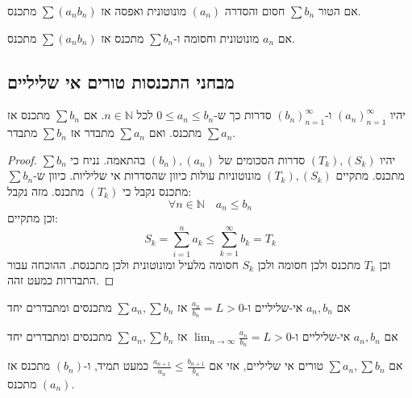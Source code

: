 \documentclass{tstextbook}
\begin{document}
\begin{proposition}
אם הטור \(\sum b_n\) חסום והסדרה \((a_n)\) מונוטונית ואפסה אז \(\sum (a_n b_n)\) מתכנס.

\end{proposition}
\begin{proposition}
אם \(a_n\) מונוטונית וחסומה ו-\(\sum b_n\) מתכנס אז \(\sum (a_n b_n)\) מתכנס.

\end{proposition}
\subsection{מבחני התכנסות טורים אי שליליים}

\begin{theorem}
יהיו \((a_n)_{n=1}^\infty\) ו-\((b_n)_{n=1}^\infty\) סדרות כך ש-\(0\leq a_{n}\leq b_{n}\) לכל \(n \in \mathbb{N}\). אם \(\sum b_{n}\) מתכנס אז \(\sum a_{n}\) מתכנס. ואם \(\sum a_{n}\) מתבדר אז \(\sum b_{n}\) מתבדר.

\end{theorem}
\begin{proof}
יהיו \((T_{k}),(S_{k})\) סדרות הסכומים של \((b_{n}),(a_{n})\) בהתאמה. נניח כי \(\sum b_{n}\) מתכנס. מתקיים \((T_{k}),(S_{k})\) מונוטוניות עולות כיוון שהסדרות אי שליליות. כיוון ש-\(\sum b_{n}\) מתכנס נקבל כי \((T_{k})\) מתכנס. מזה נקבל:
$$\forall n \in \mathbb{N} \quad a_{n}\leq b_{n}$$
וכן מתקיים:
$$S_{k}=\sum_{i=1}^{n} a_{k}\leq \sum_{k=1}^{\infty}b_{k}=T_{k}$$
וכן \(T_{k}\) מתכנס ולכן חסומה ולכן \(S_{k}\) חסומה מלעיל ומונוטונית ולכן מתכנסת. ההוכחה עבור התבדרות כמעט זהה.

\end{proof}
\begin{proposition}
אם \(a_n, b_n\) אי-שליליים ו-\(\frac{a_n}{b_n} = L >0\) אז \(\sum a_n , \sum b_n\) מתכנסים ומתבדרים יחד

\end{proposition}
\begin{proposition}
אם \(a_n, b_n\) אי-שליליים ו-\(\lim_{n\rightarrow \infty} \frac{a_n}{b_n} = L >0\) אז \(\sum a_n , \sum b_n\) מתכנסים ומתבדרים יחד

\end{proposition}
\begin{proposition}
אם \(\sum a_{n},\sum b_{n}\) טורים אי שליליים, אזי אם \(\frac{a_{n+1}}{a_{n}}\leq \frac{b_{n+1}}{b_{n}}\) כמעט תמיד, ו-\((b_{n})\) מתכנס אז \((a_{n})\) מתכנס.

\end{proposition}
\end{document}
